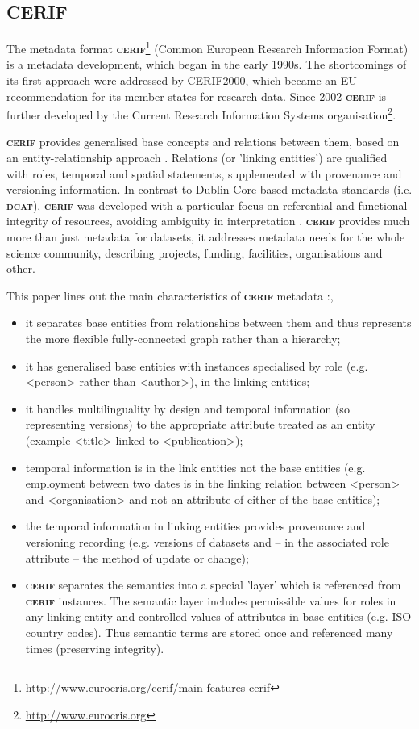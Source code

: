 \documentclass[a4paper,english,twoside,BCOR1.5cm,headsepline,DIV12,appendixprefix,final,12pt]{scrbook}
\newcommand{\dcat}{{\scshape\bfseries dcat}\xspace}
\newcommand{\cerif}{{\scshape\bfseries cerif}\xspace}
\newcommand\footnoteurl[1]{\footnote{\scriptsize\url{#1}}}
\begin{document}
\subsection{CERIF}
\label{sec:cerif}
The metadata format \cerif\footnoteurl{http://www.eurocris.org/cerif/main-features-cerif} (Common European Research Information Format) is a metadata development, which began in the early 1990s. The shortcomings of its first approach were addressed by CERIF2000, which became an EU recommendation for its member states for research data. Since 2002 \cerif is further developed by the Current Research Information Systems organisation\footnoteurl{http://www.eurocris.org}.

\cerif provides generalised base concepts and relations between them, based on an entity-relationship approach \cite{CerifJefferyA10}. Relations (or 'linking entities') are qualified with roles, temporal and spatial statements, supplemented with provenance and versioning information.
In contrast to Dublin Core based metadata standards (i.e. \dcat), \cerif was developed with a particular focus on referential and functional integrity of resources, avoiding ambiguity in interpretation \cite{jefferyCerifW3C2016}. 
\cerif provides much more than just metadata for datasets, it addresses metadata needs for the whole science community, describing projects, funding, facilities, organisations and other.

This paper lines out the main characteristics of \cerif metadata \cite{jefferyCerifW3C2016}:,
\begin{itemize}
\item it separates base entities from relationships between them and thus represents the more
flexible fully-connected graph rather than a hierarchy;
\item it has generalised base entities with instances specialised by role (e.g. <person> rather
than <author>), in the linking entities;
\item it handles multilinguality by design and temporal information (so representing versions)
to the appropriate attribute treated as an entity (example <title> linked to <publication>);
\item temporal information is in the link entities not the base entities (e.g. employment between
two dates is in the linking relation between <person> and <organisation> and not an attribute of either
of the base entities);
\item the temporal information in linking entities provides provenance and versioning recording (e.g.
versions of datasets and – in the associated role attribute – the method of update or change);
\item \cerif separates the semantics into a special 'layer' which is referenced from \cerif instances. The
semantic layer includes permissible values for roles in any linking entity and controlled
values of attributes in base entities (e.g. ISO country codes). Thus semantic terms are stored once and
referenced many times (preserving integrity). 
\end{itemize}
\end{document}
